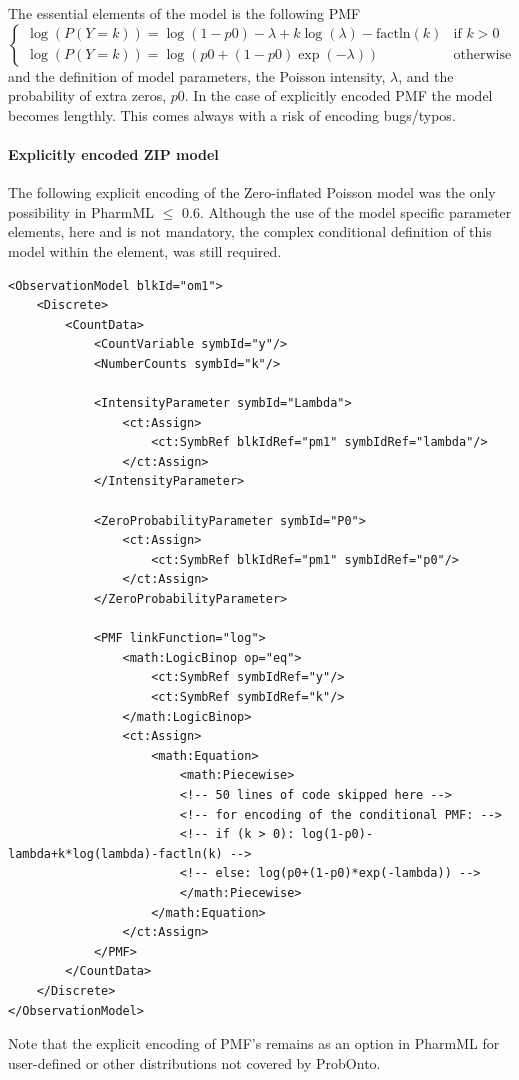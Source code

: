 The essential elements of the model is the following PMF
\[
\begin{cases}
  \log(P(Y=k)) = \log(1-p0) - \lambda + k\log(\lambda) - \text{factln}(k) 	& \text{if } k > 0 \\
  \log(P(Y=k)) = \log(p0 + (1-p0)\exp(-\lambda)) 					& \text{otherwise}
\end{cases}
\]
and the definition of model parameters, the Poisson intensity, $\lambda$,
and the probability of extra zeros, $p0$. In the case of explicitly encoded PMF
the model becomes lengthly. This comes always with a risk of encoding bugs/typos.  

\paragraph{Explicitly encoded ZIP model}
The following explicit encoding of the Zero-inflated Poisson model was the only 
possibility in PharmML $\leq$ 0.6. Although the use of the model specific parameter 
elements, here  and  is not 
mandatory, the complex conditional definition of this model within the  
element, was still required. 
\lstset{language=XML}
\begin{lstlisting}
<ObservationModel blkId="om1">
    <Discrete>
        <CountData>
            <CountVariable symbId="y"/>
            <NumberCounts symbId="k"/>
            
            <IntensityParameter symbId="Lambda">
                <ct:Assign>
                    <ct:SymbRef blkIdRef="pm1" symbIdRef="lambda"/>
                </ct:Assign>
            </IntensityParameter>
            
            <ZeroProbabilityParameter symbId="P0">
                <ct:Assign>
                    <ct:SymbRef blkIdRef="pm1" symbIdRef="p0"/>
                </ct:Assign>
            </ZeroProbabilityParameter>
            
            <PMF linkFunction="log">
                <math:LogicBinop op="eq">
                    <ct:SymbRef symbIdRef="y"/>
                    <ct:SymbRef symbIdRef="k"/>
                </math:LogicBinop>
                <ct:Assign>
                    <math:Equation>
                        <math:Piecewise>
                        <!-- 50 lines of code skipped here -->
                        <!-- for encoding of the conditional PMF: -->
                        <!-- if (k > 0): log(1-p0)-lambda+k*log(lambda)-factln(k) -->
                        <!-- else: log(p0+(1-p0)*exp(-lambda)) -->
                        </math:Piecewise>
                    </math:Equation>
                </ct:Assign>
            </PMF>
        </CountData>
    </Discrete>
</ObservationModel>
\end{lstlisting}
Note that \marginpar{\HandCuffLeft} the explicit encoding of PMF's remains
as an option in PharmML for user-defined or other distributions not covered by ProbOnto.
        
